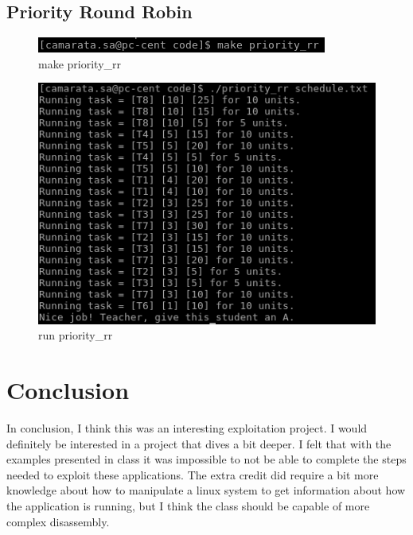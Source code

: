 \documentclass[10pt]{article}
\begin{document}
\subsection{Priority Round Robin}

\begin{figure}[H]
\centering
\includegraphics[scale=0.5]{./images/make_pri_rr.png}
\caption{make priority\_rr}
\label{fig:Code}
\end{figure}

\begin{figure}[H]
\centering
\includegraphics[scale=0.5]{./images/run_pri_rr.png}
\caption{run priority\_rr}
\label{fig:Code}
\end{figure}

\section{Conclusion}
In conclusion, I think this was an interesting exploitation project.  I would definitely be interested in a project that dives a bit deeper.  I felt that with the examples presented in class it was impossible to not be able to complete the steps needed to exploit these applications.  The extra credit did require a bit more knowledge about how to manipulate a linux system to get information about how the application is running, but I think the class should be capable of more complex disassembly.

\pagebreak
\end{document}
